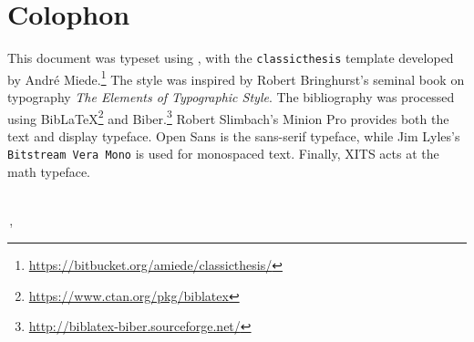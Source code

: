 \pagestyle{empty}

\hfill

\vfill


\section*{Colophon}
This document was typeset using \XeLaTeX, with the
\texttt{classicthesis} template developed by André Miede.\footnote{\url{https://bitbucket.org/amiede/classicthesis/}}
The style was inspired by Robert Bringhurst's seminal book on typography
\emph{The Elements of Typographic Style}.\autocite{Bringhurst2004-wn}
The bibliography was processed using
Bib\LaTeX\footnote{\url{https://www.ctan.org/pkg/biblatex}} and
Biber.\footnote{\url{http://biblatex-biber.sourceforge.net/}}
Robert Slimbach's Minion Pro provides both the text and display typeface.
\textsf{Open Sans} is the sans-serif typeface, while Jim Lyles's
\texttt{Bitstream Vera Mono} is used for monospaced text.
Finally, XITS acts at the math typeface.

\bigskip
{\small
\noindent\textit{\myTitle}
\\
\noindent\textcopyright\,\finalVersion, \myName
}

%
%




